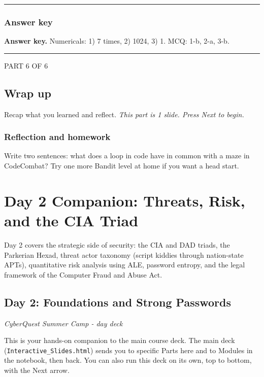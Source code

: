 \documentclass[12pt,openany]{book}
\begin{document}
\medskip\noindent\rule{\linewidth}{0.4pt}\medskip

\medskip

\subsection*{Answer key}


\textbf{Answer key.} Numericals: 1) 7 times, 2) 1024, 3) 1. MCQ: 1-b, 2-a, 3-b.


\medskip\noindent\rule{\linewidth}{0.4pt}\medskip

\medskip

\vspace{4pt}\noindent\textsc{PART 6 OF 6}


\section*{Wrap up}

Recap what you learned and reflect.
{\small\itshape\color{gray}This part is 1 slide. Press Next to begin.}

\medskip

\subsection*{Reflection and homework}


Write two sentences: what does a loop in code have in common with a maze in CodeCombat? Try one more Bandit level at home if you want a head start.

\medskip

\chapter{Day 2 Companion: Threats, Risk, and the CIA Triad}
Day 2 covers the strategic side of security: the CIA and DAD triads, the Parkerian Hexad, threat actor taxonomy (script kiddies through nation-state APTs), quantitative risk analysis using ALE, password entropy, and the legal framework of the Computer Fraud and Abuse Act.

\section*{Day 2: Foundations and Strong Passwords}
{\small\itshape\color{gray}CyberQuest Summer Camp - day deck}


This is your hands-on companion to the main course deck. The main deck (\texttt{Interactive\_Slides.html}) sends you to specific Parts here and to Modules in the notebook, then back. You can also run this deck on its own, top to bottom, with the Next arrow.
\end{document}
